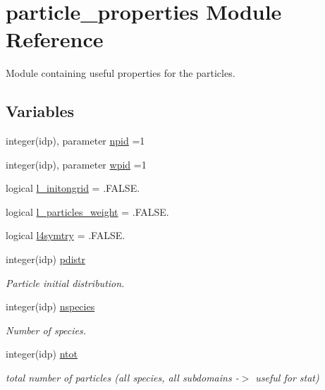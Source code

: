 \hypertarget{namespaceparticle__properties}{}\section{particle\+\_\+properties Module Reference}
\label{namespaceparticle__properties}


Module containing useful properties for the particles.  


\subsection*{Variables}
\begin{DoxyCompactItemize}
\item 
integer(idp), parameter \hyperlink{namespaceparticle__properties_a9a2b5f322610353c06693336b21439f7}{npid} =1
\item 
integer(idp), parameter \hyperlink{namespaceparticle__properties_a9661ac258a1ee308b3cad93e5da3c579}{wpid} =1
\item 
logical \hyperlink{namespaceparticle__properties_ac2f3b846a4154ff9b4cccadaffe4bfa9}{l\+\_\+initongrid} = .F\+A\+L\+S\+E.
\item 
logical \hyperlink{namespaceparticle__properties_a886a9f7d338c6c8fc14d80df9ac732ae}{l\+\_\+particles\+\_\+weight} = .F\+A\+L\+S\+E.
\item 
logical \hyperlink{namespaceparticle__properties_adf7851e9d61da6389c759e11e09d218a}{l4symtry} = .F\+A\+L\+S\+E.
\item 
integer(idp) \hyperlink{namespaceparticle__properties_aaf6c9fb8697f29ccff6e1d82ee7f477a}{pdistr}
\begin{DoxyCompactList}\small\item\em Particle initial distribution. \end{DoxyCompactList}\item 
integer(idp) \hyperlink{namespaceparticle__properties_a5aabee3c3d0e9e902989125d50e03426}{nspecies}
\begin{DoxyCompactList}\small\item\em Number of species. \end{DoxyCompactList}\item 
integer(idp) \hyperlink{namespaceparticle__properties_a9fa6e3ec64928bf64db8c78d73f97389}{ntot}
\begin{DoxyCompactList}\small\item\em total number of particles (all species, all subdomains -\/$>$ useful for stat) \end{DoxyCompactList}\item 

\end{DoxyCompactItemize}
